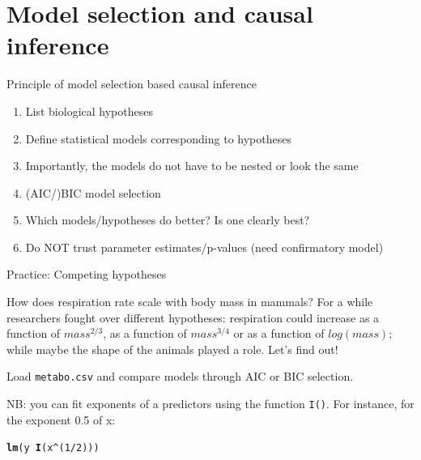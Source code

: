 \documentclass[12pt]{beamer}\usepackage[]{graphicx}\usepackage[]{color}
\makeatletter
\newcommand{\hlnum}[1]{\textcolor[rgb]{0.686,0.059,0.569}{#1}}%
\newcommand{\hlopt}[1]{\textcolor[rgb]{0,0,0}{#1}}%
\newcommand{\hlstd}[1]{\textcolor[rgb]{0.345,0.345,0.345}{#1}}%
\newcommand{\hlkwd}[1]{\textcolor[rgb]{0.737,0.353,0.396}{\textbf{#1}}}%
\newenvironment{kframe}{%
 \def\at@end@of@kframe{}%
 \ifinner\ifhmode%
  \def\at@end@of@kframe{\end{minipage}}%
  \begin{minipage}{\columnwidth}%
 \fi\fi%
 \def\FrameCommand##1{\hskip\@totalleftmargin \hskip-\fboxsep
 \colorbox{shadecolor}{##1}\hskip-\fboxsep
     \hskip-\linewidth \hskip-\@totalleftmargin \hskip\columnwidth}%
 \MakeFramed {\advance\hsize-\width
   \@totalleftmargin\z@ \linewidth\hsize
   \@setminipage}}%
 {\par\unskip\endMakeFramed%
 \at@end@of@kframe}
\newenvironment{knitrout}{}{} %
\makeatother
\begin{document}
\section{Model selection and causal inference}

\begin{frame}{Principle of model selection based causal inference}
\begin{exampleblock}{}
  \begin{enumerate}[<+->]
    \item List biological hypotheses
    \item Define statistical models corresponding to hypotheses
    \item Importantly, the models do not have to be nested or look the same
    \item (AIC/)BIC model selection
    \item Which models/hypotheses do better? Is one clearly best? 
    \item Do NOT trust parameter estimates/p-values (need confirmatory model)
  \end{enumerate}
\end{exampleblock}
\end{frame}

\begin{frame}[fragile]{Practice: Competing hypotheses}



How does respiration rate scale with body mass in mammals? For a while researchers fought over different hypotheses: respiration could increase as a function of $mass^{2/3}$, as a function of $mass^{3/4}$ or as a function of $log(mass)$; while maybe the shape of the animals played a role. Let's find out!

Load \texttt{metabo.csv} and compare models through AIC or BIC selection.

NB: you can fit exponents of a predictors using the function \texttt{I()}. For instance, for the exponent 0.5 of x:
\begin{knitrout}\small
{}\color{fgcolor}\begin{kframe}
\begin{alltt}
\hlkwd{lm}\hlstd{(y} \hlopt{~} \hlkwd{I}\hlstd{(x}\hlopt{^}\hlstd{(}\hlnum{1}\hlopt{/}\hlnum{2}\hlstd{)))}
\end{alltt}
\end{kframe}
\end{knitrout}

\end{frame}
\end{document}
